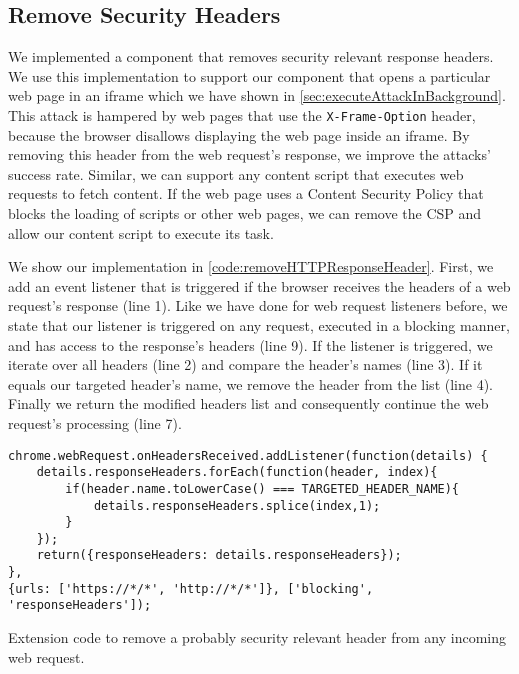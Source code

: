 \subsection{Remove Security Headers}
	
	We implemented a component that removes security relevant response headers. We use this implementation to support our component that opens a particular web page in an iframe which we have shown in \autoref{sec:executeAttackInBackground}. This attack is hampered by web pages that use the \texttt{X-Frame-Option} header, because the browser disallows displaying the web page inside an iframe. By removing this header from the web request's response, we improve the attacks' success rate. Similar, we can support any content script that executes web requests to fetch content. If the web page uses a Content Security Policy that blocks the loading of scripts or other web pages, we can remove the CSP and allow our content script to execute its task.
	
	We show our implementation in \autoref{code:removeHTTPResponseHeader}. First, we add an event listener that is triggered if the browser receives the headers of a web request's response (line 1). Like we have done for web request listeners before, we state that our listener is triggered on any request, executed in a blocking manner, and has access to the response's headers (line 9). If the listener is triggered, we iterate over all headers (line 2) and compare the header's names (line 3). If it equals our targeted header's name, we remove the header from the list (line 4). Finally we return the modified headers list and consequently continue the web request's processing (line 7). 

	\begin{code}
		\begin{lstlisting}
chrome.webRequest.onHeadersReceived.addListener(function(details) { 
	details.responseHeaders.forEach(function(header, index){
		if(header.name.toLowerCase() === TARGETED_HEADER_NAME){
			details.responseHeaders.splice(index,1);
		}
	});
	return({responseHeaders: details.responseHeaders});
},
{urls: ['https://*/*', 'http://*/*']}, ['blocking', 'responseHeaders']);
\end{lstlisting}
		\caption{Extension code to remove a probably security relevant header from any incoming web request.}
		\label{code:removeHTTPResponseHeader}
	\end{code} 


	
	
